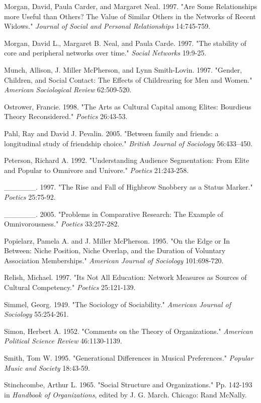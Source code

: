 \documentclass[
]{article}
\begin{document}
Morgan, David, Paula Carder, and Margaret Neal. 1997. "Are Some Relationships more Useful than Others? The Value of Similar Others in the Networks of Recent Widows." \emph{Journal of Social and Personal Relationships} 14:745-759.

Morgan, David L., Margaret B. Neal, and Paula Carde. 1997. "The stability of core and peripheral networks over time." \emph{Social Networks} 19:9-25.

Munch, Allison, J. Miller McPherson, and Lynn Smith-Lovin. 1997. "Gender, Children, and Social Contact: The Effects of Childrearing for Men and Women." \emph{American Sociological Review} 62:509-520.

Ostrower, Francie. 1998. "The Arts as Cultural Capital among Elites: Bourdieu\textquotesingle s Theory Reconsidered." \emph{Poetics} 26:43-53.

Pahl, Ray and David J. Pevalin. 2005. "Between family and friends: a longitudinal study of friendship choice." \emph{British Journal of Sociology} 56:433--450.

Peterson, Richard A. 1992. "Understanding Audience Segmentation: From Elite and Popular to Omnivore and Univore." \emph{Poetics} 21:243-258.

\_\_\_\_\_\_. 1997. "The Rise and Fall of Highbrow Snobbery as a Status Marker." \emph{Poetics} 25:75-92.

\_\_\_\_\_\_. 2005. "Problems in Comparative Research: The Example of Omnivorousness." \emph{Poetics} 33:257-282.

Popielarz, Pamela A. and J. Miller McPherson. 1995. "On the Edge or In Between: Niche Position, Niche Overlap, and the Duration of Voluntary Association Memberships." \emph{American Journal of Sociology} 101:698-720.

Relish, Michael. 1997. "It\textquotesingle s Not All Education: Network Measures as Sources of Cultural Competency." \emph{Poetics} 25:121-139.

Simmel, Georg. 1949. "The Sociology of Sociability." \emph{American Journal of Sociology} 55:254-261.

Simon, Herbert A. 1952. "Comments on the Theory of Organizations." \emph{American Political Science Review} 46:1130-1139.

Smith, Tom W. 1995. "Generational Differences in Musical Preferences." \emph{Popular Music and Society} 18:43-59.

Stinchcombe, Arthur L. 1965. "Social Structure and Organizations." Pp. 142-193 in \emph{Handbook of Organizations}, edited by J. G. March. Chicago: Rand McNally.
\end{document}
